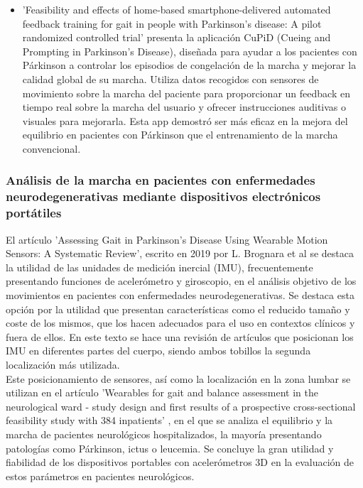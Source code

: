 \begin{itemize}
    \item 'Feasibility and effects of home-based smartphone-delivered automated feedback training for gait in people with Parkinson's disease: A pilot randomized controlled trial' \cite{GINIS201628} presenta la aplicación CuPiD (Cueing and Prompting in Parkinson's Disease), diseñada para ayudar a los pacientes con Párkinson a controlar los episodios de congelación de la marcha y mejorar la calidad global de su marcha. Utiliza datos recogidos con sensores de movimiento sobre la marcha del paciente para proporcionar un feedback en tiempo real sobre la marcha del usuario y ofrecer instrucciones auditivas o visuales para mejorarla. Esta app demostró ser más eficaz en la mejora del equilibrio en pacientes con Párkinson que el entrenamiento de la marcha convencional.
\end{itemize}
\subsubsection{Análisis de la marcha en pacientes con enfermedades neurodegenerativas mediante dispositivos electrónicos portátiles}
El artículo 'Assessing Gait in Parkinson’s Disease Using Wearable Motion Sensors: A Systematic Review', escrito en 2019 por L. Brognara et al\cite{diseases7010018} se destaca la utilidad de las unidades de medición inercial (IMU), frecuentemente presentando funciones de acelerómetro y giroscopio, en el análisis objetivo de los movimientos en pacientes con enfermedades neurodegenerativas. Se destaca esta opción por la utilidad que presentan características como el reducido tamaño y coste de los mismos, que los hacen adecuados para el uso en contextos clínicos y fuera de ellos. En este texto se hace una revisión de artículos que posicionan los IMU en diferentes partes del cuerpo, siendo ambos tobillos la segunda localización más utilizada. \\

Este posicionamiento de sensores, así como la localización en la zona lumbar se utilizan en el artículo 'Wearables for gait and balance assessment in the neurological ward - study design and first results of a prospective cross-sectional feasibility study with 384 inpatients' \cite{Bernhard2018}, en el que se analiza el equilibrio y la marcha de pacientes neurológicos hospitalizados, la mayoría presentando patologías como Párkinson, ictus o leucemia. Se concluye la gran utilidad y fiabilidad de los dispositivos portables con acelerómetros 3D en la evaluación de estos parámetros en pacientes neurológicos.\\

